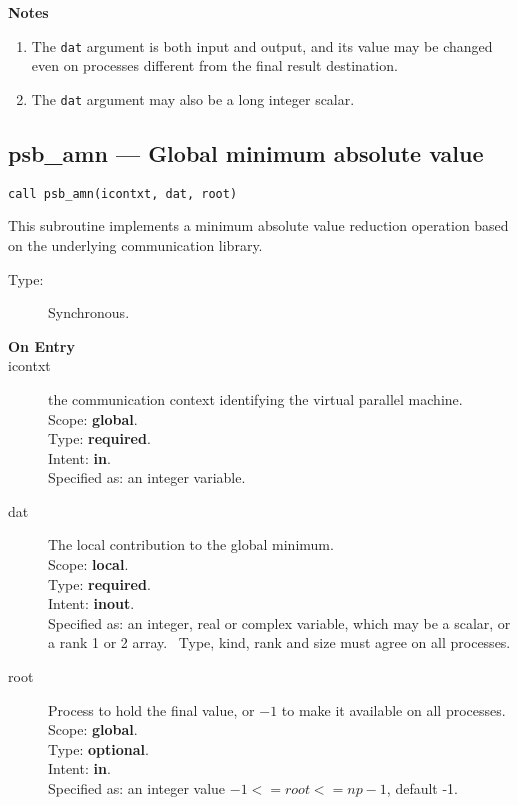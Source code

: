 {\par\noindent\large\bfseries Notes}
\begin{enumerate}
\item The \verb|dat| argument is both input and output, and its
  value may be changed even on processes different from the final
  result destination.
\item The \verb|dat| argument may also be a long integer scalar.
\end{enumerate}

\clearpage\subsection*{psb\_amn --- Global minimum absolute value}

\begin{verbatim}
call psb_amn(icontxt, dat, root)
\end{verbatim}

This subroutine implements a minimum absolute value reduction
operation based on the underlying communication library. 
\begin{description}
\item[Type:] Synchronous.
\item[\bf  On Entry ]
\item[icontxt] the communication context identifying the virtual
  parallel machine.\\
Scope: {\bf global}.\\
Type: {\bf required}.\\
Intent: {\bf in}.\\
Specified as: an integer variable.
\item[dat] The local contribution to the global minimum.\\
Scope: {\bf local}.\\
Type: {\bf required}.\\
Intent: {\bf inout}.\\
Specified as: an integer, real or complex variable, which may be a
scalar, or a rank 1 or 2 array. \
Type, kind, rank and size must agree on all processes.
\item[root] Process to hold the final value, or $-1$ to make it available
  on all processes.\\
Scope: {\bf global}.\\
Type: {\bf optional}.\\
Intent: {\bf in}.\\
Specified as: an integer value $-1<= root <= np-1$, default -1. \\
\end{description}


